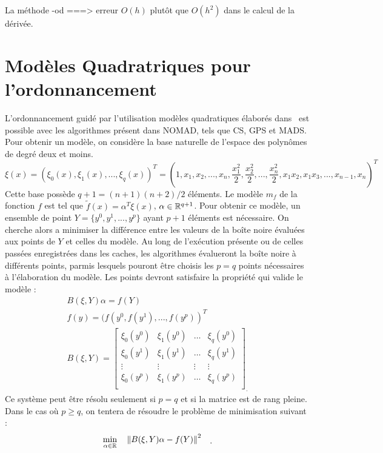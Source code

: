 La méthode \textsf{\imfil-od} ===> erreur $O(h)$ plutôt que $O(h^2)$ dans le calcul de la dérivée.
\section{Modèles Quadratriques pour l'ordonnancement}
L'ordonnancement guidé par l'utilisation modèles quadratiques élaborés dans~\cite{CoLed2011} est possible avec les algorithmes présent dans NOMAD, tels que CS, GPS et MADS. Pour obtenir un modèle, on considère la base naturelle de l'espace des polynômes de degré deux et moins. 
\begin{equation*}
\xi (x)=(\xi_0(x),\xi_1(x),...,\xi_q(x))^T = \left(1,x_1,x_2,...,x_n,\frac{x_1^2}{2},\frac{x_2^2}{2},...,\frac{x_n^2}{2},x_1 x_2, x_1 x_3,...,x_{n-1},x_{n}\right)^T
\end{equation*}
Cette base possède $q+1 = (n+1)(n+2)/2$ éléments. Le modèle $m_f$ de la fonction $f$ est tel que $\tilde{f}(x)=\alpha^T\xi(x)$, $\alpha \in \mathbb{R}^{q+1}$. Pour obtenir ce modèle, un ensemble de point $Y=\{y^0,y^1,...,y^p\}$ ayant $p+1$ éléments est nécessaire. On cherche alors a minimiser la différence entre les valeurs de la boîte noire évaluées aux points de $Y$ et celles du modèle. Au long de l'exécution présente ou de celles passées enregistrées dans les caches, les algorithmes évalueront la boîte noire à différents points, parmis lesquels pouront être choisis les $p = q$ points nécessaires à l'élaboration du modèle. Les points devront satisfaire la propriété qui valide le modèle : 
\begin{gather*}
B(\xi,Y)\alpha = f(Y)\\
f(y)=(f(y^0,f(y^1),...,f(y^p))^T\\
B(\xi,Y) = 
\begin{bmatrix}
\xi_0(y^0) & \xi_1(y^0) & \dots & \xi_q(y^0)\\
\xi_0(y^1) & \xi_1(y^1) & \dots & \xi_q(y^1)\\
\vdots & \vdots & \vdots & \vdots\\
\xi_0(y^p) & \xi_1(y^p) & \dots & \xi_q(y^p)\\
\end{bmatrix}_.
\end{gather*}
Ce système peut être résolu seulement si $p=q$ et si la matrice est de rang pleine. Dans le cas où $p\geq q$, on tentera de résoudre le problème de minimisation suivant : 
\begin{equation*}
\begin{aligned}
& \underset{\alpha \in \mathbb{R}}{\text{min}}
& & \left\lVert B(\xi,Y)\alpha -f(Y)\right\rVert^2
\end{aligned}.
\end{equation*}
